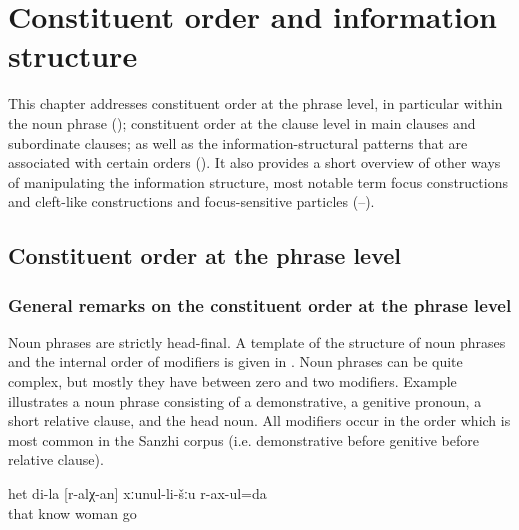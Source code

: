 \chapter{Constituent order and information structure}
\label{cpt:Constituent order and information structure}

This chapter addresses constituent order at the phrase level, in particular within the noun phrase (); constituent order at the clause level in main clauses and subordinate clauses; as well as the information-structural patterns that are associated with certain orders (). It also provides a short overview of other ways of manipulating the information structure, most notable term focus constructions and cleft-like constructions and focus-sensitive particles (--).



\section{Constituent order at the phrase level}
\label{sec:Constituent order at the phrase level}

\subsection{General remarks on the constituent order at the phrase level}
\label{ssec:General remarks on the constituent order at the phrase level}

Noun phrases are strictly head-final. A template of the structure of noun phrases and the internal order of modifiers is given in . Noun phrases can be quite complex, but mostly they have between zero and two modifiers. Example  illustrates a noun phrase consisting of a demonstrative, a genitive pronoun, a short relative clause, and the head noun. All modifiers occur in the order which is most common in the Sanzhi corpus (i.e. demonstrative before genitive before relative clause).
%
\begin{exe}
	\ex	\label{ex:‎‎‎I go to my woman who I know}
	\gll	het	di-la	[r-alχ-an]	xːunul-li-šːu	r-ax-ul=da\\
		that		{\db}know	woman	go\\
	\glt	{}
\end{exe}

